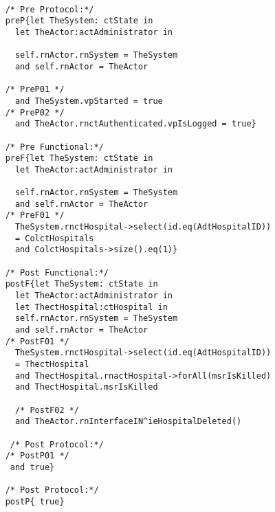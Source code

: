 	\scriptsize
	\vspace{0.5cm}
	\begin{lstlisting}[style=MessirStyle,firstnumber=auto,captionpos=b,caption={\msrmessir (MCL-oriented) specification of the operation \emph{oeDeleteHospital}.},label=OM-actAdministrator-oeDeleteHospital-MCL-LST]

	/* Pre Protocol:*/ 
	preP{let TheSystem: ctState in
	  let TheActor:actAdministrator in
	  
	  self.rnActor.rnSystem = TheSystem
	  and self.rnActor = TheActor
	  
	/* PreP01 */
	  and TheSystem.vpStarted = true
	/* PreP02 */
	  and TheActor.rnctAuthenticated.vpIsLogged = true}
	
	/* Pre Functional:*/
	preF{let TheSystem: ctState in
	  let TheActor:actAdministrator in
	   
	  self.rnActor.rnSystem = TheSystem
	  and self.rnActor = TheActor
	/* PreF01 */
	  TheSystem.rnctHospital->select(id.eq(AdtHospitalID))
	  = ColctHospitals
	  and ColctHospitals->size().eq(1)}
	
	/* Post Functional:*/ 
	postF{let TheSystem: ctState in
	  let TheActor:actAdministrator in
	  let ThectHospital:ctHospital in
	  self.rnActor.rnSystem = TheSystem
	  and self.rnActor = TheActor
	/* PostF01 */
	  TheSystem.rnctHospital->select(id.eq(AdtHospitalID))
	  = ThectHospital
	  and ThectHospital.rnactHospital->forAll(msrIsKilled)
	  and ThectHospital.msrIsKilled
	 
	  /* PostF02 */
	  and TheActor.rnInterfaceIN^ieHospitalDeleted()
	
	 /* Post Protocol:*/
	/* PostP01 */
	 and true}
	
	/* Post Protocol:*/ 
	postP{ true}
	
	\end{lstlisting}
	\normalsize 
	
	
	
	





